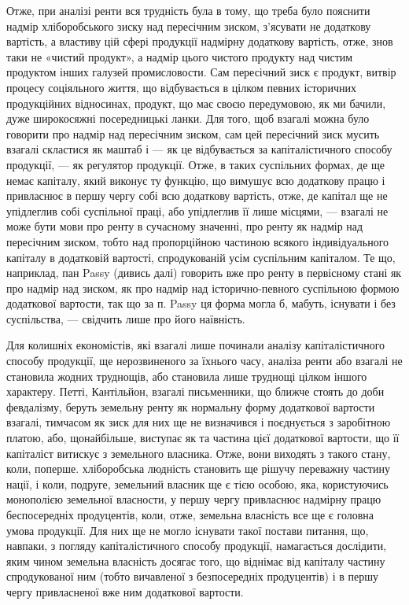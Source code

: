 Отже, при аналізі ренти вся трудність була в тому, що треба було
пояснити надмір хліборобського зиску над пересічним зиском, з’ясувати не додаткову
вартість, а властиву цій сфері продукції надмірну додаткову вартість,
отже, знов таки не «чистий продукт», а надмір цього чистого продукту над
чистим продуктом інших галузей промисловости. Сам пересічний зиск є продукт,
витвір процесу соціяльного життя, що відбувається в цілком певних історичних
продукційних відносинах, продукт, що має своєю передумовою, як ми
бачили, дуже широкосяжні посередницькі ланки. Для того, щоб взагалі можна було
говорити про надмір над пересічним зиском, сам цей пересічний зиск мусить
взагалі скластися як маштаб і — як це відбувається за капіталістичного способу
продукції, — як регулятор продукції. Отже, в таких суспільних формах, де ще
немає капіталу, який виконує ту функцію, що вимушує всю додаткову працю
і привласнює в першу чергу собі всю додаткову вартість, отже, де капітал ще
не упідлеглив собі суспільної праці, або упідлеглив її лише місцями, — взагалі
не може бути мови про ренту в сучасному значенні, про ренту як надмір
над пересічним зиском, тобто над пропорційною частиною всякого індивідуального
капіталу в додатковій вартості, спродукованій усім суспільним капіталом. Те
що, наприклад, пан Passy (дивись далі) говорить вже про ренту в первісному стані
як про надмір над зиском, як про надмір над історично-певного суспільною
формою додаткової вартости, так що за п. Passy ця форма могла б, мабуть,
існувати і без суспільства, — свідчить лише про його наївність.

Для колишніх економістів, які взагалі лише починали аналізу капіталістичного
способу продукції, ще нерозвиненого за їхнього часу, аналіза ренти
або взагалі не становила жодних труднощів, або становила лише труднощі цілком
іншого характеру. Петті, Кантільйон, взагалі письменники, що ближче стоять
до доби февдалізму, беруть земельну ренту як нормальну форму додаткової
вартости взагалі, тимчасом як зиск для них ще не визначився і поєднується
з заробітною платою, або, щонайбільше, виступає як та частина цієї
додаткової вартости, що її капіталіст витискує з земельного власника. Отже, вони
виходять з такого стану, коли, поперше. хліборобська людність становить ще рішучу
переважну частину нації, і коли, подруге, земельний власник ще є тією
особою, яка, користуючись монополією земельної власности, у першу чергу привласнює
надмірну працю беспосередніх продуцентів, коли, отже, земельна власність
все ще є головна умова продукції. Для них ще не могло існувати такої
постави питання, що, навпаки, з погляду капіталістичного способу продукції,
намагається дослідити, яким чином земельна власність досягає того, що
віднімає від капіталу частину спродукованої ним (тобто вичавленої з безпосередніх
продуцентів) і в першу чергу привласненої вже ним додаткової вартости.

